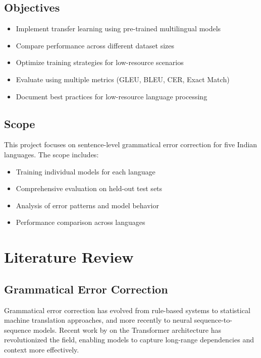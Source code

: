 \documentclass[12pt,a4paper]{article}
\begin{document}
\subsection{Objectives}
\begin{itemize}
    \item Implement transfer learning using pre-trained multilingual models
    \item Compare performance across different dataset sizes
    \item Optimize training strategies for low-resource scenarios
    \item Evaluate using multiple metrics (GLEU, BLEU, CER, Exact Match)
    \item Document best practices for low-resource language processing
\end{itemize}

\subsection{Scope}
This project focuses on sentence-level grammatical error correction for five Indian languages. The scope includes:
\begin{itemize}
    \item Training individual models for each language
    \item Comprehensive evaluation on held-out test sets
    \item Analysis of error patterns and model behavior
    \item Performance comparison across languages
\end{itemize}

\newpage

\section{Literature Review}

\subsection{Grammatical Error Correction}
Grammatical error correction has evolved from rule-based systems to statistical machine translation approaches, and more recently to neural sequence-to-sequence models. Recent work by \cite{vaswani2017attention} on the Transformer architecture has revolutionized the field, enabling models to capture long-range dependencies and context more effectively.
\end{document}
